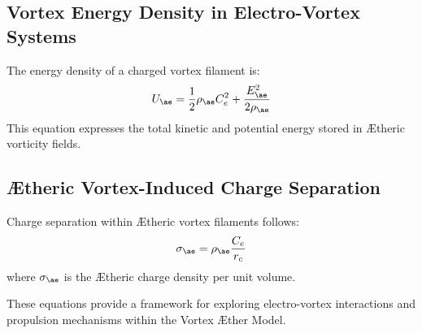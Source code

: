 \subsection{Vortex Energy Density in Electro-Vortex Systems}
The energy density of a charged vortex filament is:
\begin{equation}
    U_{\ae} = \frac{1}{2} \rho_\text{\ae} C_e^2 + \frac{E_{\ae}^2}{2 \rho_\text{\ae}}
\end{equation}
This equation expresses the total kinetic and potential energy stored in Ætheric vorticity fields.

\subsection{Ætheric Vortex-Induced Charge Separation}
Charge separation within Ætheric vortex filaments follows:
\begin{equation}
    \sigma_{\ae} = \rho_\text{\ae} \frac{C_e}{r_c}
\end{equation}
where $\sigma_{\ae}$ is the Ætheric charge density per unit volume.

These equations provide a framework for exploring electro-vortex interactions and propulsion mechanisms within the Vortex Æther Model.